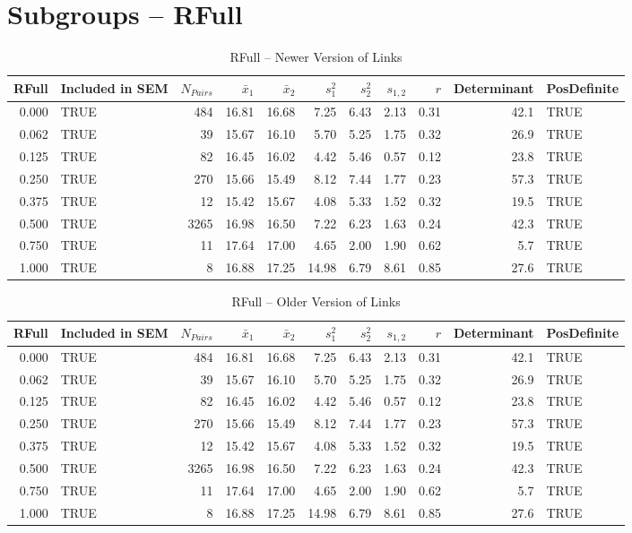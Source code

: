 \documentclass{article}\usepackage[]{graphicx}\usepackage[]{color}
\begin{document}
\section{Subgroups --  RFull }%
\begin{table}[ht]
\centering
\begin{tabular}{rlrrrrrrrrl}
  \hline
RFull & Included in SEM & $N_{Pairs}$ & $\bar{x}_1$ & $\bar{x}_2$ & $s_1^2$ & $s_2^2$ & $s_{1,2}$ & $r$ & Determinant & PosDefinite \\ 
  \hline
0.000 & TRUE & 484 & 16.81 & 16.68 & 7.25 & 6.43 & 2.13 & 0.31 & 42.1 & TRUE \\ 
  0.062 & TRUE & 39 & 15.67 & 16.10 & 5.70 & 5.25 & 1.75 & 0.32 & 26.9 & TRUE \\ 
  0.125 & TRUE & 82 & 16.45 & 16.02 & 4.42 & 5.46 & 0.57 & 0.12 & 23.8 & TRUE \\ 
  0.250 & TRUE & 270 & 15.66 & 15.49 & 8.12 & 7.44 & 1.77 & 0.23 & 57.3 & TRUE \\ 
  0.375 & TRUE & 12 & 15.42 & 15.67 & 4.08 & 5.33 & 1.52 & 0.32 & 19.5 & TRUE \\ 
  0.500 & TRUE & 3265 & 16.98 & 16.50 & 7.22 & 6.23 & 1.63 & 0.24 & 42.3 & TRUE \\ 
  0.750 & TRUE & 11 & 17.64 & 17.00 & 4.65 & 2.00 & 1.90 & 0.62 & 5.7 & TRUE \\ 
  1.000 & TRUE & 8 & 16.88 & 17.25 & 14.98 & 6.79 & 8.61 & 0.85 & 27.6 & TRUE \\ 
   \hline
\end{tabular}
\caption{RFull -- Newer Version of Links} 
\end{table}
\begin{table}[ht]
\centering
\begin{tabular}{rlrrrrrrrrl}
  \hline
RFull & Included in SEM & $N_{Pairs}$ & $\bar{x}_1$ & $\bar{x}_2$ & $s_1^2$ & $s_2^2$ & $s_{1,2}$ & $r$ & Determinant & PosDefinite \\ 
  \hline
0.000 & TRUE & 484 & 16.81 & 16.68 & 7.25 & 6.43 & 2.13 & 0.31 & 42.1 & TRUE \\ 
  0.062 & TRUE & 39 & 15.67 & 16.10 & 5.70 & 5.25 & 1.75 & 0.32 & 26.9 & TRUE \\ 
  0.125 & TRUE & 82 & 16.45 & 16.02 & 4.42 & 5.46 & 0.57 & 0.12 & 23.8 & TRUE \\ 
  0.250 & TRUE & 270 & 15.66 & 15.49 & 8.12 & 7.44 & 1.77 & 0.23 & 57.3 & TRUE \\ 
  0.375 & TRUE & 12 & 15.42 & 15.67 & 4.08 & 5.33 & 1.52 & 0.32 & 19.5 & TRUE \\ 
  0.500 & TRUE & 3265 & 16.98 & 16.50 & 7.22 & 6.23 & 1.63 & 0.24 & 42.3 & TRUE \\ 
  0.750 & TRUE & 11 & 17.64 & 17.00 & 4.65 & 2.00 & 1.90 & 0.62 & 5.7 & TRUE \\ 
  1.000 & TRUE & 8 & 16.88 & 17.25 & 14.98 & 6.79 & 8.61 & 0.85 & 27.6 & TRUE \\ 
   \hline
\end{tabular}
\caption{RFull -- Older Version of Links} 
\end{table}
\end{document}
